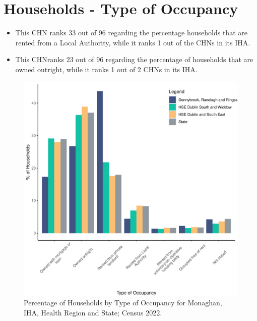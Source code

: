 \documentclass{article}
\begin{document}
\section{Households - Type of Occupancy}\label{sect:Households}
\begin{itemize}
\item This CHN ranks  33 out of 96 regarding the percentage households that are rented from a Local Authority, while it ranks  1 out of the CHNs in its IHA. 
\item This CHNranks  23 out of 96 regarding the percentage of households that are owned outright, while it ranks   1 out of 2 CHNs in its IHA.
\end{itemize}
\begin{figure}[H]
	\centering
	\includegraphics[width = 140mm]{../figures/HouseholdsED.pdf}
	\caption{Percentage of Households by Type of Occupancy for Monaghan, IHA, Health Region and State; Census 2022.}
	\label{fig:vbnv}
	\end{figure}
\end{document}
